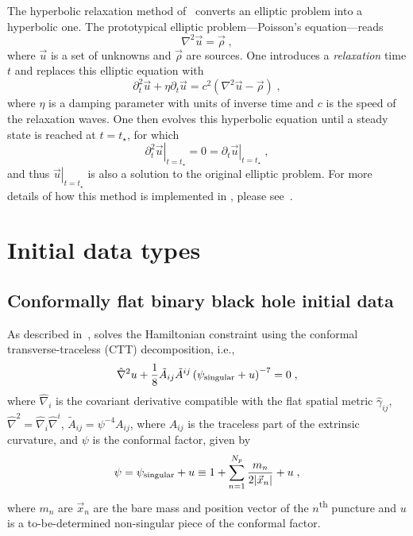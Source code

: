 The hyperbolic relaxation method of~\cite{ruter:2018} converts an elliptic
problem into a hyperbolic one. The prototypical elliptic problem---Poisson's
equation---reads
\begin{equation}
  \nabla^{2}\vec{u} = \vec{\rho}\;,
\end{equation}
where $\vec{u}$ is a set of unknowns and $\vec{\rho}$ are sources. One introduces
a \emph{relaxation} time $t$ and replaces this elliptic equation with
\begin{equation}
  \partial_{t}^{2}\vec{u} + \eta\partial_{t}\vec{u} = c^{2}\left(\nabla^{2}\vec{u} - \vec{\rho}\right)\;,
\end{equation}
where $\eta$ is a damping parameter with units of inverse time and $c$ is
the speed of the relaxation waves. One then evolves this hyperbolic equation
until a steady state is reached at $t=t_{\star}$, for which
\begin{equation}
  \left.\partial_{t}^{2}\vec{u}\right|_{t=t_{\star}} = 0 = \left.\partial_{t}\vec{u}\right|_{t=t_{\star}}\;,
\end{equation}
and thus $\left.\vec{u}\right|_{t=t_{\star}}$ is also a solution to the original
elliptic problem. For more details of how this method is implemented in \nrpyell,
please see~\cite{assumpcao:2022}.


\section{Initial data types}
\subsection{Conformally flat binary black hole initial data}

As described in~\cite{assumpcao:2022}, \nrpyell{} solves the Hamiltonian
constraint using the conformal transverse-traceless (CTT) decomposition, i.e.,
\begin{equation}
  \hat\nabla^{2}u + \frac{1}{8}\tilde{A}_{ij}\tilde{A}^{ij}\left(\psi_{\rm singular}+u\right)^{-7} = 0\;,
\end{equation}
where $\hat\nabla_{i}$ is the covariant derivative compatible with the flat
spatial metric $\hat\gamma_{ij}$, $\hat\nabla^{2} = \hat\nabla_{i}\hat\nabla^{i}$,
$\tilde{A}_{ij} = \psi^{-4}A_{ij}$, where $A_{ij}$ is the traceless part of the
extrinsic curvature, and $\psi$ is the conformal factor, given by
\begin{equation}
  \psi = \psi_{\rm singular} + u \equiv 1 + \sum_{n=1}^{N_{p}}\frac{m_{n}}{2|\vec{x}_{n}|} + u\;,
\end{equation}
where $m_{n}$ are $\vec{x}_{n}$ are the bare mass and position vector of the
$n$\textsuperscript{th} puncture and $u$ is a to-be-determined non-singular
piece of the conformal factor.


